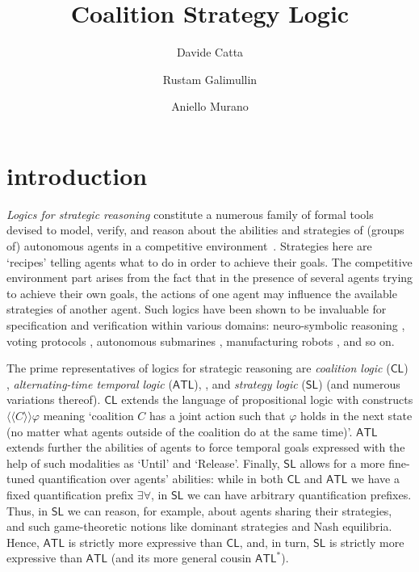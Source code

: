 \documentclass[sigconf,anonymous]{aamas}
\title[Coalition Strategy Logic]{Coalition Strategy Logic}
\author{Davide Catta}
\affiliation{
  \institution{Camelot Castle}
  \city{Camelot}
  \country{United Kingdom}}
\author{Rustam Galimullin}
\affiliation{
  \institution{The Lady's Lake}
  \city{Avalon}
  \country{United Kingdom}}
\author{Aniello Murano}
\affiliation{
  \institution{The Lady's Lake}
  \city{Avalon}
  \country{United Kingdom}}
\begin{document}

\pagestyle{fancy}
\fancyhead{}


\maketitle 


\section{introduction}
\textit{Logics for strategic reasoning} constitute a numerous family of formal tools devised to model, verify, and reason about the abilities and strategies of (groups of) autonomous agents in a competitive environment~\cite{pauly02, alur02,van2005logic,mogavero14,chatterjee2010strategy}. Strategies here are ‘recipes’ telling agents what to do in order to achieve their goals. The competitive environment part arises from the fact that in the presence of several agents trying to achieve their own goals, the actions of one agent may influence the available strategies of another agent. Such logics have been shown to be invaluable for specification and verification within various domains: neuro-symbolic reasoning \cite{akintunde20}, voting protocols \cite{jamroga18}, autonomous submarines \cite{ezekiel11}, manufacturing robots \cite{desilva17}, and so on. 

The prime representatives of logics for strategic reasoning are \textit{coalition logic} ($\mathsf{CL}$) \cite{pauly02}, \textit{alternating-time temporal logic} ($\mathsf{ATL}$), \cite{alur02}, and \textit{strategy logic} ($\mathsf{SL}$) \cite{mogavero10} (and numerous variations thereof). $\mathsf{CL}$ extends the language of propositional logic with constructs $\langle \! \langle C \rangle \! \rangle \varphi$ meaning `coalition $C$ has a joint action such that $\varphi$ holds in the next state (no matter what agents outside of the coalition do at the same time)'. $\mathsf{ATL}$ extends further the abilities of agents to force temporal goals expressed with the help of such modalities as `\textsf{U}ntil' and `\textsf{R}elease'. Finally, $\mathsf{SL}$ allows for a more fine-tuned quantification over agents' abilities: while in both $\mathsf{CL}$ and $\mathsf{ATL}$ we have a fixed quantification prefix $\exists \forall$, in $\mathsf{SL}$ we can have arbitrary quantification prefixes. Thus, in $\mathsf{SL}$ we can reason, for example, about agents sharing their strategies, and such game-theoretic notions like dominant strategies and Nash equilibria.  Hence, $\mathsf{ATL}$ is strictly more expressive than $\mathsf{CL}$, and, in turn, $\mathsf{SL}$ is strictly more expressive than $\mathsf{ATL}$ (and its more general cousin $\mathsf{ATL}^\ast$).
\end{document}
